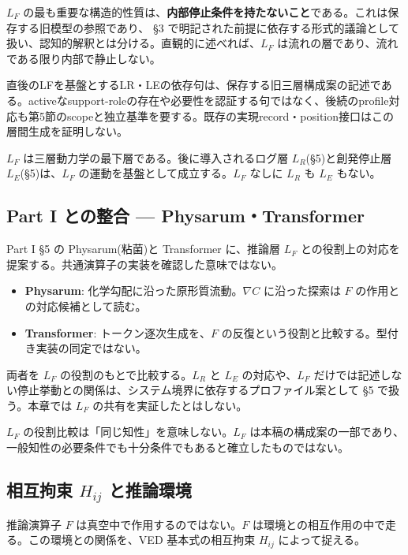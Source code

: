 $L_F$ の最も重要な構造的性質は、\textbf{内部停止条件を持たないこと}である。これは保存する旧模型の参照であり、 \S{}3 で明記された前提に依存する形式的議論として扱い、認知的解釈とは分ける。直観的に述べれば、$L_F$ は流れの層であり、流れである限り内部で静止しない。

直後のLFを基盤とするLR・LEの依存句は、保存する旧三層構成案の記述である。activeなsupport-roleの存在や必要性を認証する句ではなく、後続のprofile対応も第5節のscopeと独立基準を要する。既存の実現record・position接口はこの層間生成を証明しない。

$L_F$ は三層動力学の最下層である。後に導入されるログ層 $L_R$(\S{}5)と創発停止層 $L_E$(\S{}5)は、$L_F$ の運動を基盤として成立する。$L_F$ なしに $L_R$ も $L_E$ もない。

\bigskip


\subsection{Part I との整合 — Physarum・Transformer}


Part I \S{}5 の Physarum(粘菌)と Transformer に、推論層 $L_F$ との役割上の対応を提案する。共通演算子の実装を確認した意味ではない。

\begin{itemize}
\item \textbf{Physarum}: 化学勾配に沿った原形質流動。$\nabla C$ に沿った探索は $F$ の作用との対応候補として読む。
\item \textbf{Transformer}: トークン逐次生成を、$F$ の反復という役割と比較する。型付き実装の同定ではない。
\end{itemize}


両者を $L_F$ の役割のもとで比較する。$L_R$ と $L_E$ の対応や、$L_F$ だけでは記述しない停止挙動との関係は、システム境界に依存するプロファイル案として \S{}5 で扱う。本章では $L_F$ の共有を実証したとはしない。

$L_F$ の役割比較は「同じ知性」を意味しない。$L_F$ は本稿の構成案の一部であり、一般知性の必要条件でも十分条件でもあると確立したものではない。

\bigskip


\subsection{相互拘束 $H_{ij}$ と推論環境}


推論演算子 $F$ は真空中で作用するのではない。$F$ は環境との相互作用の中で走る。この環境との関係を、VED 基本式の相互拘束 $H_{ij}$ によって捉える。


